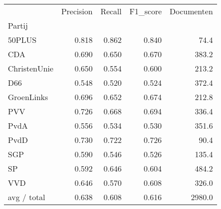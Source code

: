 \begin{tabular}{lrrrr}
\toprule
{} &  Precision &  Recall &  F1\_score &  Documenten \\
Partij       &            &         &           &             \\
\midrule
50PLUS       &      0.818 &   0.862 &     0.840 &        74.4 \\
   CDA       &      0.690 &   0.650 &     0.670 &       383.2 \\
ChristenUnie &      0.650 &   0.554 &     0.600 &       213.2 \\
   D66       &      0.548 &   0.520 &     0.524 &       372.4 \\
  GroenLinks &      0.696 &   0.652 &     0.674 &       212.8 \\
   PVV       &      0.726 &   0.668 &     0.694 &       336.4 \\
  PvdA       &      0.556 &   0.534 &     0.530 &       351.6 \\
  PvdD       &      0.730 &   0.722 &     0.726 &        90.4 \\
   SGP       &      0.590 &   0.546 &     0.526 &       135.4 \\
    SP       &      0.592 &   0.646 &     0.604 &       484.2 \\
   VVD       &      0.646 &   0.570 &     0.608 &       326.0 \\
 avg / total &      0.638 &   0.608 &     0.616 &      2980.0 \\
\bottomrule
\end{tabular}
